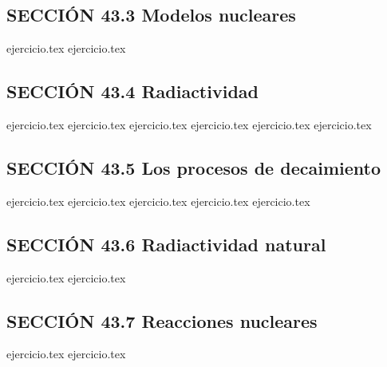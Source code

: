 \subsection*{SECCIÓN 43.3 Modelos nucleares}
\begin{enumerate}
    \setcounter{enumi}{10}
    {ejercicio.tex}
    {ejercicio.tex}
\end{enumerate}

\subsection*{SECCIÓN 43.4 Radiactividad}
\begin{enumerate}
    \setcounter{enumi}{12}
    {ejercicio.tex}
    {ejercicio.tex}
    {ejercicio.tex}
    {ejercicio.tex}
    {ejercicio.tex}
    {ejercicio.tex}
\end{enumerate}

\subsection*{SECCIÓN 43.5 Los procesos de decaimiento}
\begin{enumerate}
    \setcounter{enumi}{18}
    {ejercicio.tex}
    {ejercicio.tex}
    {ejercicio.tex}
    {ejercicio.tex}
    {ejercicio.tex}
\end{enumerate}

\subsection*{SECCIÓN 43.6 Radiactividad natural}
\begin{enumerate}
    \setcounter{enumi}{23}
    {ejercicio.tex}
    {ejercicio.tex}
\end{enumerate}

\subsection*{SECCIÓN 43.7 Reacciones nucleares}
\begin{enumerate}
    \setcounter{enumi}{25}
    {ejercicio.tex}
    {ejercicio.tex}
\end{enumerate}

